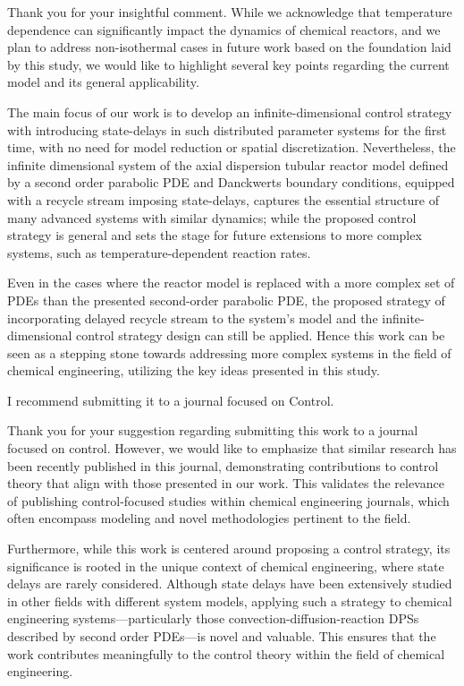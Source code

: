\documentclass[12pt,answers]{exam}
\begin{document}
\begin{questions}
    \begin{solutionorbox}
        Thank you for your insightful comment. While we acknowledge that temperature dependence can significantly impact the dynamics of chemical reactors, and we plan to address non-isothermal cases in future work based on the foundation laid by this study, we would like to highlight several key points regarding the current model and its general applicability.

        The main focus of our work is to develop an infinite-dimensional control strategy with introducing state-delays in such distributed parameter systems for the first time, with no need for model reduction or spatial discretization. Nevertheless, the infinite dimensional system of the axial dispersion tubular reactor model defined by a second order parabolic PDE and Danckwerts boundary conditions, equipped with a recycle stream imposing state-delays, captures the essential structure of many advanced systems with similar dynamics; while the proposed control strategy is general and sets the stage for future extensions to more complex systems, such as temperature-dependent reaction rates.

        Even in the cases where the reactor model is replaced with a more complex set of PDEs than the presented second-order parabolic PDE, the proposed strategy of incorporating delayed recycle stream to the system's model and the infinite-dimensional control strategy design can still be applied. Hence this work can be seen as a stepping stone towards addressing more complex systems in the field of chemical engineering, utilizing the key ideas presented in this study.
    \end{solutionorbox}


    \question I recommend submitting it to a journal focused on Control.

    \begin{solutionorbox}
        Thank you for your suggestion regarding submitting this work to a journal focused on control. However, we would like to emphasize that similar research \cite{li2024novel, azhin2021modelling} has been recently published in this journal, demonstrating contributions to control theory that align with those presented in our work. This validates the relevance of publishing control-focused studies within chemical engineering journals, which often encompass modeling and novel methodologies pertinent to the field.

        Furthermore, while this work is centered around proposing a control strategy, its significance is rooted in the unique context of chemical engineering, where state delays are rarely considered. Although state delays have been extensively studied in other fields with different system models, applying such a strategy to chemical engineering systems—particularly those convection-diffusion-reaction DPSs described by second order PDEs—is novel and valuable. This ensures that the work contributes meaningfully to the control theory within the field of chemical engineering.
    \end{solutionorbox}

\end{questions}
\end{document}
